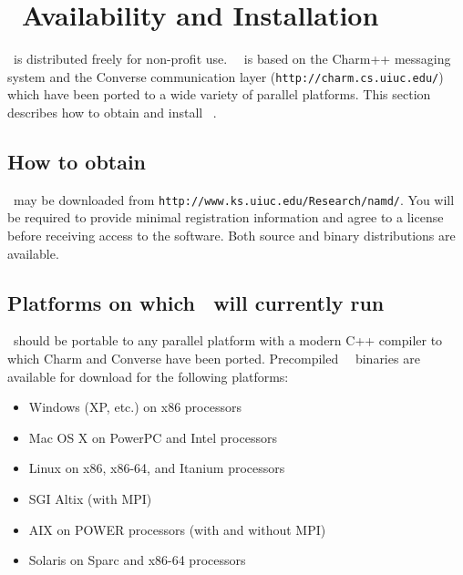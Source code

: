 
\section{\NAMD\ Availability and Installation}
\label{section:avail}

\NAMD\ is distributed freely for non-profit use.
\NAMD\ \NAMDVER\ is based on the Charm++ messaging system and the
Converse communication layer ({\tt http://charm.cs.uiuc.edu/})
which have been ported to a wide variety of parallel platforms.
This section describes how to obtain and install \NAMD\ \NAMDVER.

\subsection{How to obtain \NAMD}

\NAMD\ may be downloaded from {\tt http://www.ks.uiuc.edu/Research/namd/}.
You will be required to provide minimal registration information and
agree to a license before receiving access to the software.
Both source and binary distributions are available.

\subsection{Platforms on which \NAMD\ will currently run}
\NAMD\ should be portable to any parallel platform with a
modern C++ compiler to which Charm and Converse have been ported.
Precompiled \NAMD\ \NAMDVER\ binaries are available for
download for the following platforms:  

\begin{itemize}
\item Windows (XP, etc.) on x86 processors
\item Mac OS X on PowerPC and Intel processors
\item Linux on x86, x86-64, and Itanium processors
\item SGI Altix (with MPI)
\item AIX on POWER processors (with and without MPI)
\item Solaris on Sparc and x86-64 processors
\end{itemize}


